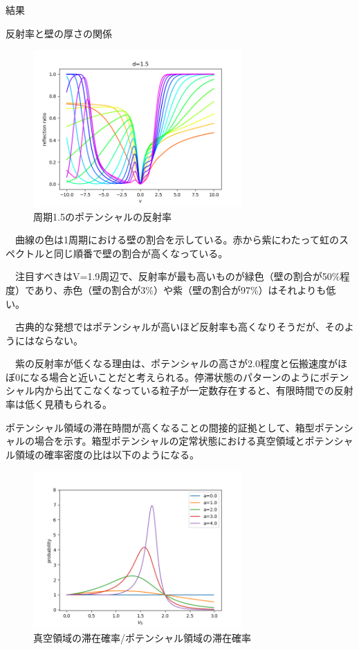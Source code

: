 \documentclass[a4paper, lualatex]{bxjsarticle}
\begin{document}
\begin{section}{結果}
\begin{subsection}{反射率と壁の厚さの関係}
        \begin{figure}[h]
            \centering
            \includegraphics[width=8cm]{hansha.png}
            \caption{周期1.5のポテンシャルの反射率}
        \end{figure}
    \par　曲線の色は1周期における壁の割合を示している。赤から紫にわたって虹のスペクトルと同じ順番で壁の割合が高くなっている。
    \par　注目すべきはV=1.9周辺で、反射率が最も高いものが緑色（壁の割合が50\%程度）であり、赤色（壁の割合が3\%）や紫（壁の割合が97\%）はそれよりも低い。
    \par　古典的な発想ではポテンシャルが高いほど反射率も高くなりそうだが、そのようにはならない。
\newpage
    \par　紫の反射率が低くなる理由は、ポテンシャルの高さが2.0程度と伝搬速度がほぼ0になる場合と近いことだと考えられる。停滞状態のパターンのようにポテンシャル内から出てこなくなっている粒子が一定数存在すると、有限時間での反射率は低く見積もられる。
    \par ポテンシャル領域の滞在時間が高くなることの間接的証拠として、箱型ポテンシャルの場合を示す。箱型ポテンシャルの定常状態における真空領域とポテンシャル領域の確率密度の比は以下のようになる。
     \begin{figure}[h]
        \centering
        \includegraphics[width=8cm]{hako_in.png}
        \caption{真空領域の滞在確率/ポテンシャル領域の滞在確率}

\end{figure}
\end{subsection}
\end{section}
\end{document}
